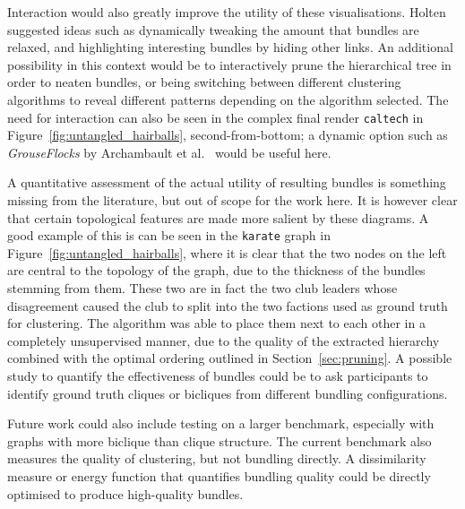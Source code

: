 Interaction would also greatly improve the utility of these visualisations. Holten \cite{Holten2006} suggested ideas such as dynamically tweaking the amount that bundles are relaxed, and highlighting interesting bundles by hiding other links. An additional possibility in this context would be to interactively prune the hierarchical tree in order to neaten bundles, or being switching between different clustering algorithms to reveal different patterns depending on the algorithm selected.
The need for interaction can also be seen in the complex final render \texttt{caltech} in Figure~\ref{fig:untangled_hairballs}, second-from-bottom; a dynamic option such as \emph{GrouseFlocks} by Archambault et al.\ \cite{Archambault2008} would be useful here.

A quantitative assessment of the actual utility of resulting bundles is something missing from the literature, but out of scope for the work here.
It is however clear that certain topological features are made more salient by these diagrams. A good example of this is can be seen in the \texttt{karate} graph in Figure~\ref{fig:untangled_hairballs}, where it is clear that the two nodes on the left are central to the topology of the graph, due to the thickness of the bundles stemming from them. These two are in fact the two club leaders whose disagreement caused the club to split into the two factions used as ground truth for clustering. The algorithm was able to place them next to each other in a completely unsupervised manner, due to the quality of the extracted hierarchy combined with the optimal ordering \cite{Bar-Joseph2001} outlined in Section~\ref{sec:pruning}.
A possible study to quantify the effectiveness of bundles could be to ask participants to identify ground truth cliques or bicliques from different bundling configurations.

Future work could also include testing on a larger benchmark, especially with graphs with more biclique than clique structure.
The current benchmark also measures the quality of clustering, but not bundling directly. A dissimilarity measure or energy function that quantifies bundling quality could be directly optimised to produce high-quality bundles.



